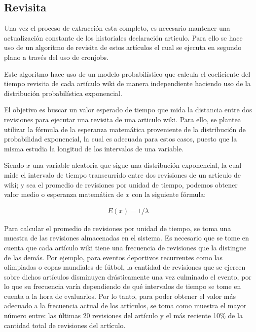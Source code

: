 \subsection{Revisita}

Una vez el proceso de extracción esta completo,
es necesario mantener una actualización constante de los historiales declaración articulo.
Para ello se hace uso de un algoritmo de revisita de estos artículos
el cual se ejecuta en segundo plano a través del uso de cronjobs.

Este algoritmo hace uso de un modelo probabilístico que calcula el coeficiente del tiempo revisita de cada artículo wiki de manera independiente haciendo uso de la distribución probabilística exponencial.

El objetivo es buscar un valor esperado de tiempo que mida la distancia entre dos revisiones para ejecutar una revisita de una articulo wiki.
Para ello, se plantea utilizar la fórmula de la esperanza matemática proveniente de la distribución de probabilidad exponencial, la cual es adecuada para estos casos, puesto que la misma estudia la longitud de los intervalos de una variable.

Siendo $x$  una variable aleatoria que sigue una distribución exponencial, la cual mide el intervalo de tiempo transcurrido entre dos revisiones de un artículo de wiki;
y sea  el promedio de revisiones por unidad de tiempo, podemos obtener valor medio o esperanza  matemática de $x$ con la siguiente fórmula:

\begin{gather*}
E(x) = 1 / \lambda
\end{gather*}

Para calcular el promedio de revisiones por unidad de tiempo, se toma una muestra de las revisiones almacenadas en el sistema.
Es necesario que se tome en cuenta que cada artículo wiki tiene una frecuencia de revisiones que la distingue de las demás.
Por ejemplo, para eventos deportivos recurrentes como las olimpiadas o copas mundiales de fútbol, la cantidad de revisiones que se ejercen sobre dichos artículos disminuyen drásticamente una vez culminado el evento, por lo que su frecuencia varía dependiendo de qué intervalos de tiempo se tome en cuenta a la hora de evaluarlos.
Por lo tanto, para poder obtener el valor más adecuado a la frecuencia actual de los artículos, se toma como muestra el mayor número entre: las últimas 20 revisiones del artículo y el más reciente 10\% de la cantidad total de revisiones del artículo.

